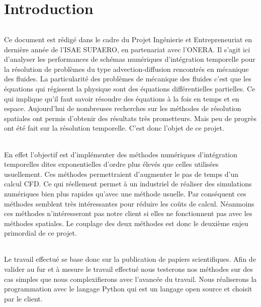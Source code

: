 \part*{Introduction}

\paragraph{}
Ce document est rédigé dans le cadre du Projet Ingénierie et Entrepreneuriat en dernière année de l'ISAE SUPAERO, en partenariat avec l'ONERA. Il s'agit ici d'analyser les performances de schémas numériques d’intégration temporelle pour la résolution de problèmes du type advection-diffusion rencontrés en mécanique des fluides. La particularité des problèmes de mécanique des fluides c'est que les équations qui régissent la physique sont des équations différentielles partielles. Ce qui implique qu'il faut savoir résoudre des équations à la fois en temps et en espace. Aujourd'hui de nombreuses recherches sur les méthodes de résolution spatiales ont permis d'obtenir des résultats très prometteurs. Mais peu de progrès ont été fait sur la résolution temporelle. C'est donc l'objet de ce projet.

\paragraph{}
En effet l'objectif est d'implémenter des méthodes numériques d'intégration temporelles dites \og exponentielles \fg{} d'ordre plus élevés que celles utilisées usuellement. Ces méthodes permettraient d'augmenter le pas de temps d'un calcul CFD. Ce qui réellement permet à un industriel de réaliser des simulations numériques bien plus rapides qu'avec une méthode usuelle. Par conséquent ces méthodes semblent très intéressantes pour réduire les coûts de calcul. Néanmoins ces méthodes n'intéresseront pas notre client si elles ne fonctionnent pas avec les méthodes spatiales. Le couplage des deux méthodes est donc le deuxième enjeu primordial de ce projet.

\paragraph{}
Le travail effectué se base donc sur la publication de papiers scientifiques. Afin de valider au fur et à mesure le travail effectué nous testerons nos méthodes sur des cas simples que nous complexifierons avec l'avancée du travail. Nous réaliserons la programmation avec le langage Python qui est un langage open source et choisit par le client.

